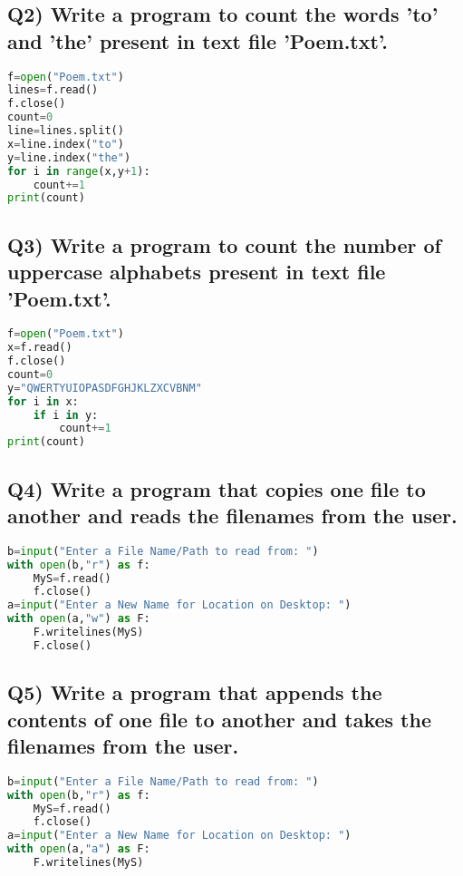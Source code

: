 \documentclass{article}
\begin{document}
\subsection*{Q2) Write a program to count the words 'to' and 'the' present in text file 'Poem.txt'.}
\begin{lstlisting}[language=Python]
f=open("Poem.txt")
lines=f.read()
f.close()
count=0
line=lines.split()
x=line.index("to")
y=line.index("the")
for i in range(x,y+1):
    count+=1
print(count)
\end{lstlisting}

\subsection*{Q3) Write a program to count the number of uppercase alphabets present in text file 'Poem.txt'.}
\begin{lstlisting}[language=Python]
f=open("Poem.txt")
x=f.read()
f.close()
count=0
y="QWERTYUIOPASDFGHJKLZXCVBNM"
for i in x:
    if i in y:
        count+=1
print(count)
\end{lstlisting}

\subsection*{Q4) Write a program that copies one file to another and reads the filenames from the user.}
\begin{lstlisting}[language=Python]
b=input("Enter a File Name/Path to read from: ")
with open(b,"r") as f:
    MyS=f.read()
    f.close()
a=input("Enter a New Name for Location on Desktop: ")
with open(a,"w") as F:
    F.writelines(MyS)
    F.close()
\end{lstlisting}

\subsection*{Q5) Write a program that appends the contents of one file to another and takes the filenames from the user.}
\begin{lstlisting}[language=Python]
b=input("Enter a File Name/Path to read from: ")
with open(b,"r") as f:
    MyS=f.read()
    f.close()
a=input("Enter a New Name for Location on Desktop: ")
with open(a,"a") as F:
    F.writelines(MyS)
\end{lstlisting}
\end{document}

